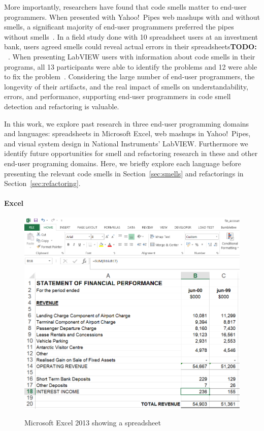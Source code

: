 \documentclass[10pt,conference,compsocconf]{IEEEtran}
\newcommand{\todo}[1]{\textbf{TODO: #1}}
\begin{document}
More importantly, researchers have  found that code smells matter to end-user programmers.
When presented with Yahoo!\ Pipes web mashups with and without smells, a significant majority of end-user programmers preferred the pipes without smells~\cite{StoleeTSE2013}.
In a field study done with 10 spreadsheet users at an investment bank, users agreed smells could reveal actual errors in their spreadsheets\todo{~\cite{}}.
When presenting LabVIEW users with information about code smells in their programs, all 13 participants were able to identify the problems and 12 were able to fix the problem~\cite{chambers2013smell}.
Considering the large number of end-user programmers, the longevity of their artifacts, and the real impact of smells on understandability, errors, and performance, supporting end-user programmers in code smell detection and refactoring is valuable. 

In this work, we explore past research in three end-user programming domains and languages: spreadsheets in Microsoft Excel, web mashups in Yahoo!\ Pipes, and visual system design in National Instruments' LabVIEW. Furthermore we identify future opportunities for smell and refactoring research in these and other end-user programing domains. Here, we briefly explore each language  before presenting the relevant code smells in  Section~\ref{sec:smells} and refactorings in Section~\ref{sec:refactoring}.

\paragraph{Excel}

\begin{figure}
\caption{Microsoft Excel 2013 showing a spreadsheet}
\centering
\includegraphics[width=\columnwidth]{excel-2}
\label{fig:spreadsheetexample}
\end{figure}
\end{document}
